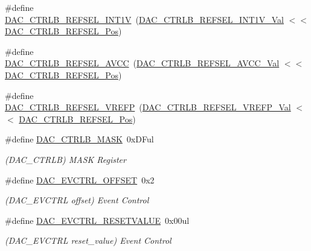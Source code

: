 \begin{DoxyCompactItemize}
\#define \mbox{\hyperlink{group___s_a_m_d21___d_a_c_ga9a53c260c228abfd923a15064f1a1525}{D\+A\+C\+\_\+\+C\+T\+R\+L\+B\+\_\+\+R\+E\+F\+S\+E\+L\+\_\+\+I\+N\+T1V}}~(\mbox{\hyperlink{group___s_a_m_d21___d_a_c_gafc2e72a0d035fcbf05dad162c768467c}{D\+A\+C\+\_\+\+C\+T\+R\+L\+B\+\_\+\+R\+E\+F\+S\+E\+L\+\_\+\+I\+N\+T1\+V\+\_\+\+Val}}    $<$$<$ \mbox{\hyperlink{group___s_a_m_d21___d_a_c_gace1da3ee1cda6efe12a220080a718b99}{D\+A\+C\+\_\+\+C\+T\+R\+L\+B\+\_\+\+R\+E\+F\+S\+E\+L\+\_\+\+Pos}})
\item 
\#define \mbox{\hyperlink{group___s_a_m_d21___d_a_c_ga70dc3629848778c513b61220e3a47107}{D\+A\+C\+\_\+\+C\+T\+R\+L\+B\+\_\+\+R\+E\+F\+S\+E\+L\+\_\+\+A\+V\+CC}}~(\mbox{\hyperlink{group___s_a_m_d21___d_a_c_ga0ec9e0f724ebc16f883f720380d25771}{D\+A\+C\+\_\+\+C\+T\+R\+L\+B\+\_\+\+R\+E\+F\+S\+E\+L\+\_\+\+A\+V\+C\+C\+\_\+\+Val}}     $<$$<$ \mbox{\hyperlink{group___s_a_m_d21___d_a_c_gace1da3ee1cda6efe12a220080a718b99}{D\+A\+C\+\_\+\+C\+T\+R\+L\+B\+\_\+\+R\+E\+F\+S\+E\+L\+\_\+\+Pos}})
\item 
\#define \mbox{\hyperlink{group___s_a_m_d21___d_a_c_gaa2619d9edfd1b7945c69719f63456f5b}{D\+A\+C\+\_\+\+C\+T\+R\+L\+B\+\_\+\+R\+E\+F\+S\+E\+L\+\_\+\+V\+R\+E\+FP}}~(\mbox{\hyperlink{group___s_a_m_d21___d_a_c_ga63711351571cbeb5c161639aee8d6252}{D\+A\+C\+\_\+\+C\+T\+R\+L\+B\+\_\+\+R\+E\+F\+S\+E\+L\+\_\+\+V\+R\+E\+F\+P\+\_\+\+Val}}    $<$$<$ \mbox{\hyperlink{group___s_a_m_d21___d_a_c_gace1da3ee1cda6efe12a220080a718b99}{D\+A\+C\+\_\+\+C\+T\+R\+L\+B\+\_\+\+R\+E\+F\+S\+E\+L\+\_\+\+Pos}})
\item 
\#define \mbox{\hyperlink{group___s_a_m_d21___d_a_c_gaa12ea04e34d8557ae1e628862714e207}{D\+A\+C\+\_\+\+C\+T\+R\+L\+B\+\_\+\+M\+A\+SK}}~0x\+D\+Ful
\begin{DoxyCompactList}\small\item\em (D\+A\+C\+\_\+\+C\+T\+R\+LB) M\+A\+SK Register \end{DoxyCompactList}\item 
\#define \mbox{\hyperlink{group___s_a_m_d21___d_a_c_ga554a475582005e674b535a88927abc9f}{D\+A\+C\+\_\+\+E\+V\+C\+T\+R\+L\+\_\+\+O\+F\+F\+S\+ET}}~0x2
\begin{DoxyCompactList}\small\item\em (D\+A\+C\+\_\+\+E\+V\+C\+T\+RL offset) Event Control \end{DoxyCompactList}\item 
\#define \mbox{\hyperlink{group___s_a_m_d21___d_a_c_gae95bd54234ae16d3e9ee3291b4c883c5}{D\+A\+C\+\_\+\+E\+V\+C\+T\+R\+L\+\_\+\+R\+E\+S\+E\+T\+V\+A\+L\+UE}}~0x00ul
\begin{DoxyCompactList}\small\item\em (D\+A\+C\+\_\+\+E\+V\+C\+T\+RL reset\+\_\+value) Event Control \end{DoxyCompactList}\item 
$$
\end{DoxyCompactItemize}
